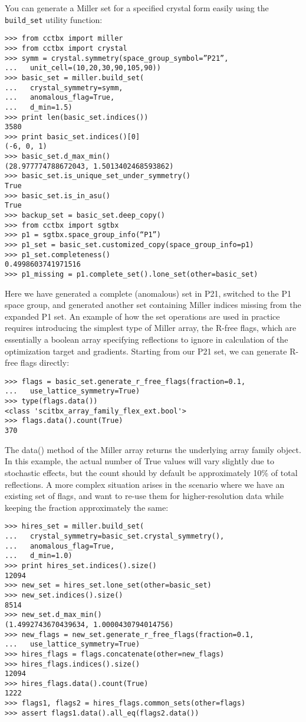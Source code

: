 \documentclass{article}
\begin{document}
You can generate a Miller set for a specified crystal form easily using the
{\tt build\_set} utility function:

\begin{Verbatim}
>>> from cctbx import miller
>>> from cctbx import crystal
>>> symm = crystal.symmetry(space_group_symbol=”P21”,
...   unit_cell=(10,20,30,90,105,90))
>>> basic_set = miller.build_set(
...   crystal_symmetry=symm,
...   anomalous_flag=True,
...   d_min=1.5)
>>> print len(basic_set.indices())
3580
>>> print basic_set.indices()[0]
(-6, 0, 1)
>>> basic_set.d_max_min()
(28.977774788672043, 1.5013402468593862)
>>> basic_set.is_unique_set_under_symmetry()
True
>>> basic_set.is_in_asu()
True
>>> backup_set = basic_set.deep_copy()
>>> from cctbx import sgtbx
>>> p1 = sgtbx.space_group_info(“P1”)
>>> p1_set = basic_set.customized_copy(space_group_info=p1)
>>> p1_set.completeness()
0.4998603741971516
>>> p1_missing = p1.complete_set().lone_set(other=basic_set)
\end{Verbatim}


Here we have generated a complete (anomalous) set in P21, switched to the P1 space group, and generated another set containing Miller indices missing from the expanded P1 set.  An example of how the set operations are used in practice requires introducing the simplest type of Miller array, the R-free flags, which are essentially a boolean array specifying reflections to ignore in calculation of the optimization target and gradients.  Starting from our P21 set, we can generate R-free flags directly:

\begin{Verbatim}
>>> flags = basic_set.generate_r_free_flags(fraction=0.1,
...   use_lattice_symmetry=True)
>>> type(flags.data())
<class 'scitbx_array_family_flex_ext.bool'>
>>> flags.data().count(True)
370
\end{Verbatim}


The data() method of the Miller array returns the underlying array family
object.  In this example, the actual number of True values will vary slightly
due to stochastic effects, but the count should by default be approximately
10\% of total reflections.  A more complex situation arises in the scenario
where we have an existing set of flags, and want to re-use them for
higher-resolution data while keeping the fraction approximately the same:

\begin{Verbatim}
>>> hires_set = miller.build_set(
...   crystal_symmetry=basic_set.crystal_symmetry(),
...   anomalous_flag=True,
...   d_min=1.0)
>>> print hires_set.indices().size()
12094
>>> new_set = hires_set.lone_set(other=basic_set)
>>> new_set.indices().size()
8514
>>> new_set.d_max_min()
(1.4992743670439634, 1.0000430794014756)
>>> new_flags = new_set.generate_r_free_flags(fraction=0.1,
...   use_lattice_symmetry=True)
>>> hires_flags = flags.concatenate(other=new_flags)
>>> hires_flags.indices().size()
12094
>>> hires_flags.data().count(True)
1222
>>> flags1, flags2 = hires_flags.common_sets(other=flags)
>>> assert flags1.data().all_eq(flags2.data())
\end{Verbatim}
\end{document}
